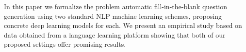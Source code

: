 In this paper we formalize the problem automatic fill-in-the-blank question generation using two standard NLP machine learning schemes, proposing concrete deep learning models for each. We present an empirical study based on data obtained from a language learning platform showing that both of our proposed settings offer promising results.
